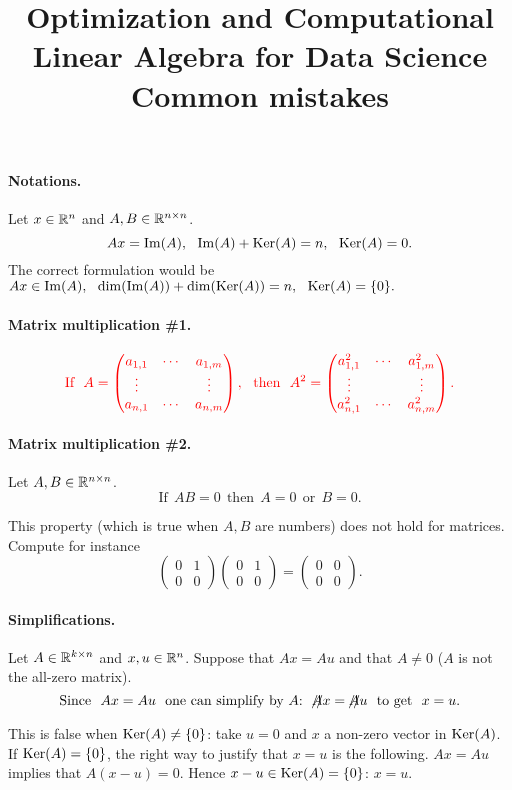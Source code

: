\documentclass[11pt,nocut]{article}
\title{\vspace{-2.0cm}%
	Optimization and Computational Linear Algebra for Data Science\\
Common mistakes}
\date{}
\begin{document}
\maketitle

\paragraph{Notations.} Let $x \in \mathbb{R}^n$ and $A,B \in \mathbb{R}^{n \times n}$.
{\color{red}
	$$
	Ax = \Im(A), \ \ \Im(A) + \Ker(A) = n, \ \ \Ker(A) = 0.
	$$
}
The correct formulation would be $
Ax \in {{\rm Im}}(A), \ \ {{\rm dim}}({{\rm Im}}(A)) + {{\rm dim}}({{\rm Ker}}(A)) = n, \ \ {{\rm Ker}}(A) = \{0\}.
$
\paragraph{Matrix multiplication \#1.}
$$
{\color{red}
	\text{If} \ \
	A = 
	\begin{pmatrix}
		a_{1,1} & \cdots & a_{1,m} \\
		\vdots & & \vdots \\
		a_{n,1} & \cdots & a_{n,m}
	\end{pmatrix},
	\ \ \text{then} \ \
	A^2
	=
	\begin{pmatrix}
		a_{1,1}^2 & \cdots & a_{1,m}^2 \\
		\vdots & & \vdots \\
		a_{n,1}^2 & \cdots & a_{n,m}^2
	\end{pmatrix}.
}
$$

\paragraph{Matrix multiplication \#2.}
Let $A,B \in \mathbb{R}^{n \times n}$.
{\color{red}
	$$
	\text{If} \ \ AB=0 \ \ \text{then} \ \ A=0 \ \ \text{or} \ \ B=0.
	$$
}

This property (which is true when $A,B$ are numbers) does not hold for matrices. Compute for instance
$$
\begin{pmatrix}
	0 & 1 \\
	0 & 0 
\end{pmatrix}
\begin{pmatrix}
	0 & 1 \\
	0 & 0 
\end{pmatrix}
=
\begin{pmatrix}
	0 & 0 \\
	0 & 0 
\end{pmatrix}.
$$
\paragraph{Simplifications.}
Let $A \in \mathbb{R}^{k \times n}$ and $x,u \in \mathbb{R}^n$. Suppose that $Ax=Au$ and that $A \neq 0$ ($A$ is not the all-zero matrix).
{\color{red}
	$$
	\text{Since} \ \ Ax=Au \ \ \text{one can simplify by $A$:} \ \ \xout{A} x = \xout{A} u \ \ \text{to get} \ \ x=u.
	$$
}
This is false when ${{\rm Ker}}(A) \neq \{0\}$: take $u=0$ and $x$ a non-zero vector in ${{\rm Ker}}(A)$. If ${{\rm Ker}}(A) = \{0\}$, the right way to justify that $x=u$ is the following. $Ax = Au$ implies that $A(x-u) = 0$. Hence $x-u \in {{\rm Ker}}(A) = \{0\}$: $x=u$.
\end{document}
